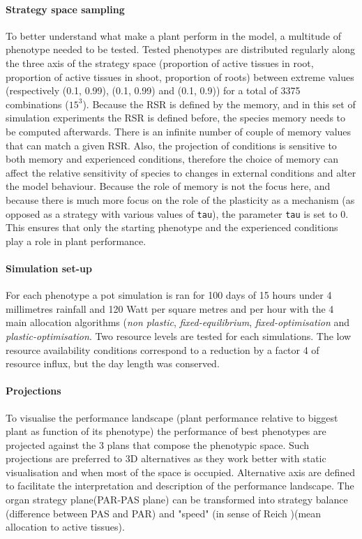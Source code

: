 \paragraph{Strategy space sampling}
To better understand what make a plant perform in the model, a multitude of phenotype needed to be tested. Tested phenotypes are distributed regularly along the three axis of the strategy space (proportion of active tissues in root, proportion of active tissues in shoot, proportion of roots) between extreme values (respectively (0.1, 0.99), (0.1, 0.99) and (0.1, 0.9)) for a total of 3375 combinations ($15^{3}$).  Because the RSR is defined by the memory, and in this set of simulation experiments the RSR is defined before, the species memory needs to be computed afterwards. There is an infinite number of couple of memory values that can match a given RSR. Also, the projection of conditions is sensitive to both memory and experienced conditions, therefore the choice of memory can affect the relative sensitivity of species to changes in external conditions and alter the model behaviour. Because the role of memory is not the focus here, and because there is much more focus on the role of the plasticity as a mechanism (as opposed as a strategy with various values of \texttt{tau}), the parameter \texttt{tau} is set to 0. This ensures that only the starting phenotype and the experienced conditions play a role in plant performance.

\paragraph{Simulation set-up}

For each phenotype a pot simulation is ran for 100 days of 15 hours under 4 millimetres rainfall and 120 Watt per square metres and per hour with the 4 main allocation algorithms (\textit{non plastic}, \textit{fixed-equilibrium}, \textit{fixed-optimisation} and \textit{plastic-optimisation}. Two resource levels are tested for each simulations. The low resource availability conditions correspond to a reduction by a factor 4 of resource influx, but the day length was conserved.

\paragraph{Projections}

To visualise the performance landscape (plant performance relative to biggest plant as function of its phenotype) the performance of best phenotypes are projected against the 3 plans that compose the phenotypic space. Such projections are preferred to 3D alternatives as they work better with static visualisation and when most of the space is occupied. Alternative axis are defined to facilitate the interpretation and description of the performance landscape. The organ strategy plane(PAR-PAS plane) can be transformed into strategy balance (difference between PAS and PAR) and "speed" (in sense of Reich \cite{reich_world-wide_2014})(mean allocation to active tissues).

